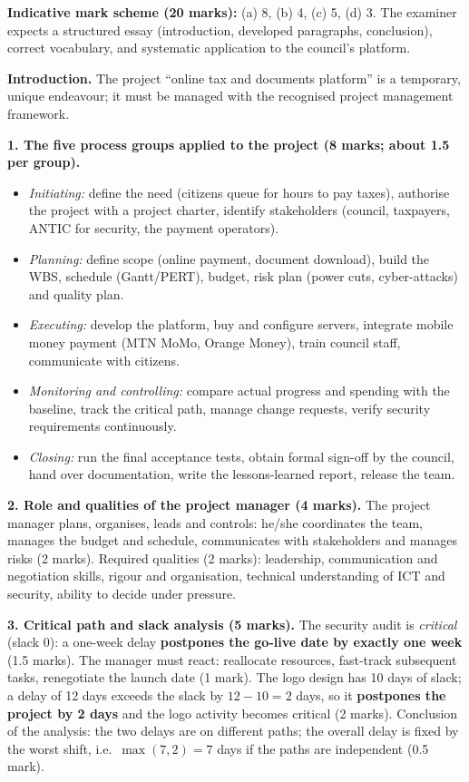 \documentclass[11pt]{article}
\begin{document}
\begin{corrige}
\textbf{Indicative mark scheme (20 marks):} (a) 8, (b) 4, (c) 5, (d) 3. The examiner expects a structured essay (introduction, developed paragraphs, conclusion), correct vocabulary, and systematic application to the council's platform.

\textbf{Introduction.} The project ``online tax and documents platform'' is a temporary, unique endeavour; it must be managed with the recognised project management framework.

\textbf{1. The five process groups applied to the project (8 marks; about 1.5 per group).}
\begin{itemize}
\item \emph{Initiating:} define the need (citizens queue for hours to pay taxes), authorise the project with a project charter, identify stakeholders (council, taxpayers, ANTIC for security, the payment operators).
\item \emph{Planning:} define scope (online payment, document download), build the WBS, schedule (Gantt/PERT), budget, risk plan (power cuts, cyber-attacks) and quality plan.
\item \emph{Executing:} develop the platform, buy and configure servers, integrate mobile money payment (MTN MoMo, Orange Money), train council staff, communicate with citizens.
\item \emph{Monitoring and controlling:} compare actual progress and spending with the baseline, track the critical path, manage change requests, verify security requirements continuously.
\item \emph{Closing:} run the final acceptance tests, obtain formal sign-off by the council, hand over documentation, write the lessons-learned report, release the team.
\end{itemize}

\textbf{2. Role and qualities of the project manager (4 marks).} The project manager plans, organises, leads and controls: he/she coordinates the team, manages the budget and schedule, communicates with stakeholders and manages risks (2 marks). Required qualities (2 marks): leadership, communication and negotiation skills, rigour and organisation, technical understanding of ICT and security, ability to decide under pressure.

\textbf{3. Critical path and slack analysis (5 marks).} The security audit is \emph{critical} (slack 0): a one-week delay \textbf{postpones the go-live date by exactly one week} (1.5 marks). The manager must react: reallocate resources, fast-track subsequent tasks, renegotiate the launch date (1 mark). The logo design has 10 days of slack; a delay of 12 days exceeds the slack by $12 - 10 = 2$ days, so it \textbf{postpones the project by 2 days} and the logo activity becomes critical (2 marks). Conclusion of the analysis: the two delays are on different paths; the overall delay is fixed by the worst shift, i.e.\ $\max(7, 2) = 7$ days if the paths are independent (0.5 mark).


\end{corrige}
\end{document}
